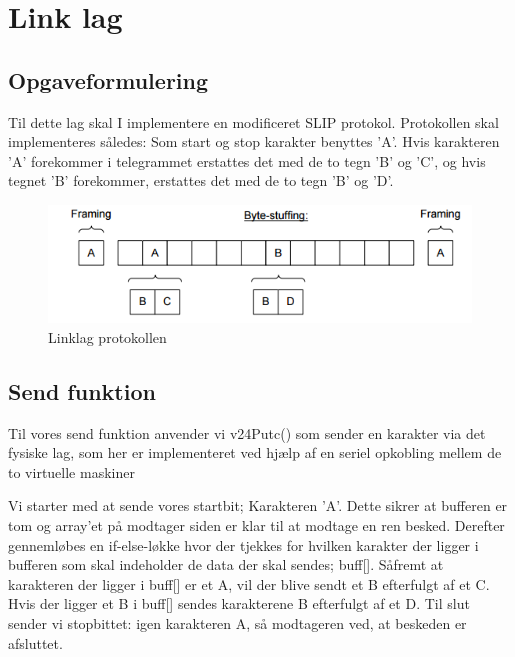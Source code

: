 \chapter{Link lag}

\section{Opgaveformulering}

Til dette lag skal I implementere en modificeret SLIP protokol.
Protokollen skal implementeres således: Som start og stop karakter benyttes ’A’. Hvis karakteren ’A’ forekommer i telegrammet erstattes det med de to tegn ’B’ og ’C’, og hvis tegnet ’B’ forekommer, erstattes det med de to tegn ’B’ og ’D’.

\begin{figure}[htbp]
\centering
\includegraphics[width=1\linewidth]{Subpages/Billeder/Linklag}
\caption{Linklag protokollen}
\label{fig:Linklag}
\end{figure}

\section{Send funktion}
Til vores send funktion anvender vi v24Putc() som sender en karakter via det fysiske lag, som her er implementeret ved hjælp af en seriel opkobling mellem de to virtuelle maskiner

Vi starter med at sende vores startbit; Karakteren 'A'. 
Dette sikrer at bufferen er tom og array'et på modtager siden er klar til at modtage en ren besked. 
Derefter gennemløbes en if-else-løkke hvor der tjekkes for hvilken karakter der ligger i bufferen som skal indeholder de data der skal sendes; buff[]. Såfremt at karakteren der ligger i buff[] er et A, vil der blive sendt et B efterfulgt af et C. Hvis der ligger et B i buff[] sendes karakterene B efterfulgt af et D. Til slut sender vi stopbittet: igen karakteren A, så modtageren ved, at beskeden er afsluttet.

